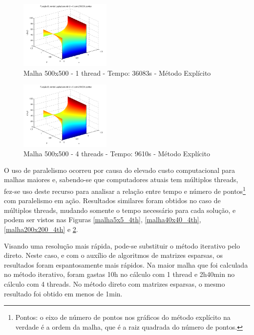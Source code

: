 \documentclass[journal]{IEEEtran}
\begin{document}
\begin{figure}[ht!]

\centering
\includegraphics[width = 0.4\textwidth]{figures/problema01_m1/06.png}
\caption{Malha 500x500 - 1 thread - Tempo: 36083s - Método Explícito\label{malha500x500_1th}}
\end{figure}

\begin{figure}[ht!]

\centering
\includegraphics[width = 0.4\textwidth]{figures/problema01_m1/15.png}
\caption{Malha 500x500 - 4 threads - Tempo: 9610s - Método Explícito\label{malha500x500_4th}}
\end{figure}

O uso de paralelismo ocorreu por causa do elevado custo computacional para malhas maiores e, sabendo-se que computadores atuais tem múltiplos threads, fez-se uso deste recurso para analisar a relação entre tempo e número de pontos\footnote{Pontos: o eixo de número de pontos nos gráficos do método explícito na verdade é a ordem da malha, que é a raiz quadrada do número de pontos.} com paralelismo em ação. Resultados similares foram obtidos no caso de múltiplos threads, mudando somente o tempo necessário para cada solução, e podem ser vistos nas Figuras \ref{malha5x5_4th}, \ref{malha40x40_4th}, \ref{malha200x200_4th} e \ref{malha500x500_4th}.

Visando uma resolução mais rápida, pode-se substituir o método iterativo pelo direto. Neste caso, e com o auxílio de algoritmos de matrizes esparsas, os resultados foram espantosamente mais rápidos. Na maior malha que foi calculada no método iterativo, foram gastas 10h no cálculo com 1 thread e 2h40min no cálculo com 4 threads. No método direto com matrizes esparsas, o mesmo resultado foi obtido em menos de 1min.
\end{document}
